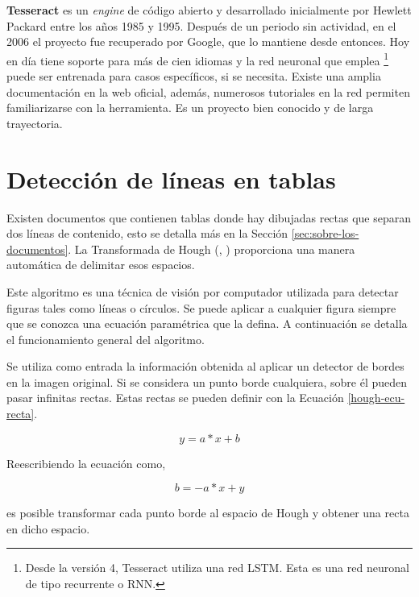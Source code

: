 \textbf{Tesseract} \cite{ocr_tesseract_smith_paper} es un \emph{engine} de código abierto y desarrollado inicialmente por Hewlett Packard \cite{ocr_tesseract_v4_release_notes} entre los años 1985 y 1995. Después de un periodo sin actividad, en el 2006 el proyecto fue recuperado por Google, que lo mantiene desde entonces. Hoy en día tiene soporte para más de cien idiomas y la red neuronal que emplea \footnote{Desde la versión 4, Tesseract utiliza una red LSTM. Esta es una red neuronal de tipo recurrente o RNN.} puede ser entrenada para casos específicos, si se necesita. Existe una amplia documentación en la web oficial, además, numerosos tutoriales en la red permiten familiarizarse con la herramienta. Es un proyecto bien conocido y de larga trayectoria.

\section{Detección de líneas en tablas}

Existen documentos que contienen tablas donde hay dibujadas rectas que separan dos líneas de contenido, esto se detalla más en la Sección \ref{sec:sobre-los-documentos}. La Transformada de Hough (\cite{hough_krishna_computerVision}, \cite{hough_grauman_presentation}) proporciona una manera automática de delimitar esos espacios.

Este algoritmo es una técnica de visión por computador utilizada para detectar figuras tales como líneas o círculos. Se puede aplicar a cualquier figura siempre que se conozca una ecuación paramétrica que la defina. A continuación se detalla el funcionamiento general del algoritmo.

Se utiliza como entrada la información obtenida al aplicar un detector de bordes en la imagen original. Si se considera un punto borde cualquiera, sobre él pueden pasar infinitas rectas. Estas rectas se pueden definir con la Ecuación \ref{hough-ecu-recta}.

\begin{equation}
    \label{hough-ecu-recta}
    y = a*x + b
\end{equation}

Reescribiendo la ecuación como,

\begin{equation}
b = -a*x + y
\end{equation}

es posible transformar cada punto borde al espacio de Hough y obtener una recta en dicho espacio.

